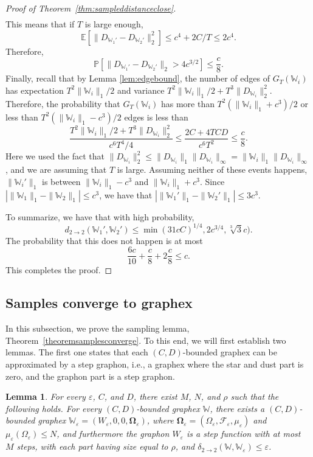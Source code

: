 \documentclass{amsart}
\numberwithin{equation}{section}
\numberwithin{figure}{section}
\newtheorem{lemma}[theorem]{Lemma}
\theoremstyle{definition}
\theoremstyle{remark}
\newcommand{\bOmega}{{\mathbf{\Omega}}}
\newcommand{\EE}{\mathbb{E}}
\newcommand{\PP}{\mathbb{P}}
\newcommand{\cW}{\mathbb{W}}
\newcommand{\cF}{\mathcal{F}}
\newcommand{\deltt}{\delta_{2\to 2}}
\def\d22{d_{2\to 2}}
\begin{document}
\begin{proof}[Proof of Theorem~\ref{thm:sampleddistanceclose}]
\begin{align*}
\end{align*}
This means that if $T$ is large enough,
\[\EE\left[\|D_{\cW_1'}-D_{\cW_2'}\|_2^2\right]\le
c^4+2C/T\leq 2c^4
.\]
Therefore,
\[\PP[\|D_{\cW_1'}-D_{\cW_2'}\|_2>4c^{3/2}] \le \frac{c}{8}
.\] Finally, recall that by Lemma \ref{lem:edgebound}, the
number of edges of $G_T(\cW_i)$ has expectation $T^2 \|\cW_i\|_1/2$ and
variance $T^2\|\cW_i\|_1/2+T^3\|D_{\cW_i}\|_2^2$. Therefore, the probability
that $G_T(\cW_i)$ has more than $T^2(\|\cW_i\|_1+c^3)/2$ or less than
$T^2(\|\cW_i\|_1-c^3)/2$ edges is less than
\[\frac{T^2\|\cW_i\|_1/2+T^3\|D_{\cW_i}\|_2^2}{c^6T^4/4} \le \frac{2C + 4TCD}{c^6T^2} \le \frac{c}{8}.
\]
Here we used the fact that $\|D_{\cW_i}\|_2^2 \le
\|D_{\cW_i}\|_1\|D_{\cW_i}\|_\infty= \|\cW_i\|_1\|D_{\cW_i}\|_\infty$, and we
are assuming that $T$ is large. Assuming neither of these events happens,
$\|\cW_i'\|_1$ is between $\|\cW_i\|_1-c^3$ and $\|\cW_i\|_1+c^3$. Since
$|\|\cW_1\|_1-\|\cW_2\|_1| \le c^3$, we have that
$|\|\cW_1'\|_1-\|\cW_2'\|_1| \le 3c^3$.

To summarize, we have that with high probability,
\[\d22(\cW_1',\cW_2') \le \min(31cC)^{1/4}, 2c^{3/4},\sqrt[3]{3}c)
.\]
The probability that this does not happen is at most
\[\frac{6c}{10}+\frac{c}{8}+2\frac{c}{8} \le c
.\]
This completes the proof.
\end{proof}

\subsection{Samples converge to graphex} \label{sec:samplesconvtographex}

In this subsection, we prove the sampling lemma,
Theorem~\ref{theoremsamplesconverge}. To this end, we will first establish
two lemmas. The first one states that each $(C,D)$-bounded graphex can be
approximated by a step graphon, i.e., a graphex where the star and dust part
is zero, and the graphon part is a step graphon.

\begin{lemma}\label{lem:graphon-approx-of-graphex}
For every $\varepsilon$, $C$, and $D$, there exist $M$, $N$, and $\rho$ such
that the following holds. For every $(C,D)$-bounded graphex $\cW$, there
exists a $(C,D)$-bounded graphex
$\cW_\varepsilon=(W_\varepsilon,0,0,\bOmega_\varepsilon)$, where
$\bOmega_\varepsilon=(\Omega_\varepsilon,\cF_\varepsilon,\mu_\varepsilon)$
and $\mu_\varepsilon(\Omega_\varepsilon) \le N$, and furthermore the graphon
$W_\varepsilon$ is a step function with at most $M$ steps, with each part
having size equal to $\rho$, and $\deltt(\cW,\cW_\varepsilon) \le
\varepsilon$.
\end{lemma}
\end{document}
